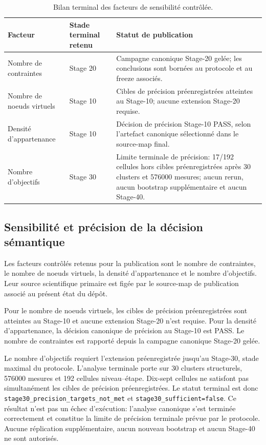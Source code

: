 

\begin{table}[t]
\centering
\caption{Bilan terminal des facteurs de sensibilité contrôlée.}
\label{tab:sensitivity-final}
\small
\begin{tabular}{p{}p{}p{}}
\hline
Facteur & Stade terminal retenu & Statut de publication \\
\hline
Nombre de contraintes
& Stage 20
& Campagne canonique Stage-20 gelée; les conclusions sont bornées au protocole et au freeze associés. \\

Nombre de noeuds virtuels
& Stage 10
& Cibles de précision préenregistrées atteintes au Stage-10; aucune extension Stage-20 requise. \\

Densité d'appartenance
& Stage 10
& Décision de précision Stage-10 PASS, selon l'artefact canonique sélectionné dans le source-map final. \\

Nombre d'objectifs
& Stage 30
& Limite terminale de précision: 17/192 cellules hors cibles préenregistrées après 30 clusters et 576000 mesures; aucun rerun, aucun bootstrap supplémentaire et aucun Stage-40. \\
\hline
\end{tabular}
\end{table}


\subsection{Sensibilité et précision de la décision sémantique}

Les facteurs contrôlés retenus pour la publication sont le nombre de
contraintes, le nombre de noeuds virtuels, la densité d'appartenance
et le nombre d'objectifs. Leur source scientifique primaire est
figée par le source-map de publication associé au présent état du
dépôt.

Pour le nombre de noeuds virtuels, les cibles de précision
préenregistrées sont atteintes au Stage-10 et aucune extension
Stage-20 n'est requise. Pour la densité d'appartenance, la décision
canonique de précision au Stage-10 est PASS. Le nombre de contraintes
est rapporté depuis la campagne canonique Stage-20 gelée.

Le nombre d'objectifs requiert l'extension préenregistrée jusqu'au
Stage-30, stade maximal du protocole. L'analyse terminale porte sur
30 clusters structurels, 576000 mesures et 192 cellules
niveau--étape. Dix-sept cellules ne satisfont pas simultanément les
cibles de précision préenregistrées. Le statut terminal est donc
\texttt{stage30\_precision\_targets\_not\_met} et
\texttt{stage30\_sufficient=false}. Ce résultat n'est pas un échec
d'exécution: l'analyse canonique s'est terminée correctement et
constitue la limite de précision terminale prévue par le protocole.
Aucune réplication supplémentaire, aucun nouveau bootstrap et aucun
Stage-40 ne sont autorisés.

